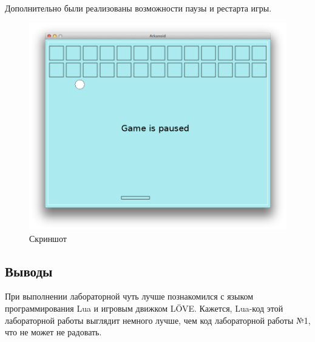 \documentclass[12pt]{article}
\begin{document}
Дополнительно были реализованы возможности паузы и рестарта игры.

\begin{figure}[!htb]
  \centering
    \includegraphics[scale=0.5]{pics/game.png}
   \caption{Скриншот}
    \label{fig:game}
\end{figure}

\subsection*{Выводы}
При выполнении лабораторной чуть лучше познакомился с языком программирования Lua и игровым
движком LÖVE. Кажется, Lua-код этой лабораторной работы выглядит немного лучше, чем код лабораторной работы
№1, что не может не радовать.
\end{document}

